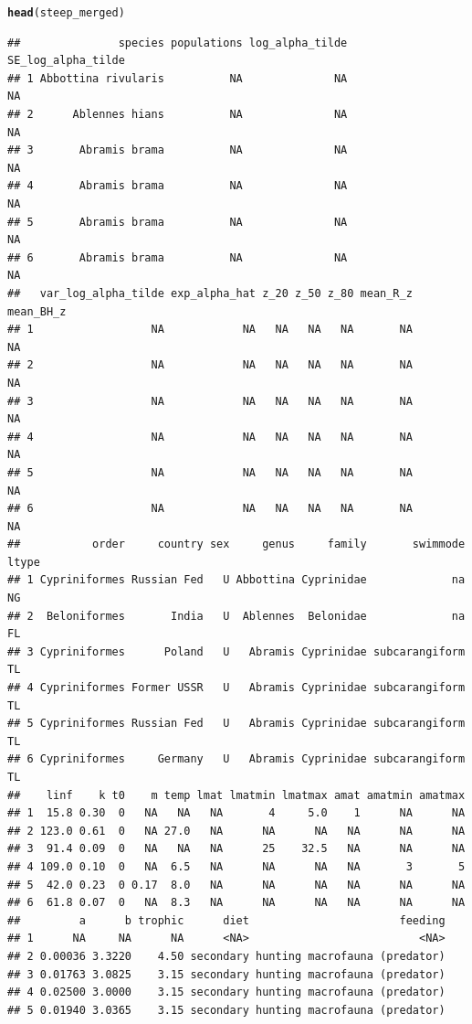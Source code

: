 \documentclass{dragonfly-report}\usepackage[]{graphicx}\usepackage[]{color}
\makeatletter
\newcommand{\hlstd}[1]{\textcolor[rgb]{0.345,0.345,0.345}{#1}}%
\newcommand{\hlkwd}[1]{\textcolor[rgb]{0.737,0.353,0.396}{\textbf{#1}}}%
\newenvironment{kframe}{%
 \def\at@end@of@kframe{}%
 \ifinner\ifhmode%
  \def\at@end@of@kframe{\end{minipage}}%
  \begin{minipage}{\columnwidth}%
 \fi\fi%
 \def\FrameCommand##1{\hskip\@totalleftmargin \hskip-\fboxsep
 \colorbox{shadecolor}{##1}\hskip-\fboxsep
     \hskip-\linewidth \hskip-\@totalleftmargin \hskip\columnwidth}%
 \MakeFramed {\advance\hsize-\width
   \@totalleftmargin\z@ \linewidth\hsize
   \@setminipage}}%
 {\par\unskip\endMakeFramed%
 \at@end@of@kframe}
\newenvironment{knitrout}{}{} %
\makeatother
\begin{document}
\begin{knitrout}
\begin{kframe}
\begin{alltt}
\hlkwd{head}\hlstd{(steep_merged)}
\end{alltt}
\begin{verbatim}
##               species populations log_alpha_tilde SE_log_alpha_tilde
## 1 Abbottina rivularis          NA              NA                 NA
## 2      Ablennes hians          NA              NA                 NA
## 3       Abramis brama          NA              NA                 NA
## 4       Abramis brama          NA              NA                 NA
## 5       Abramis brama          NA              NA                 NA
## 6       Abramis brama          NA              NA                 NA
##   var_log_alpha_tilde exp_alpha_hat z_20 z_50 z_80 mean_R_z mean_BH_z
## 1                  NA            NA   NA   NA   NA       NA        NA
## 2                  NA            NA   NA   NA   NA       NA        NA
## 3                  NA            NA   NA   NA   NA       NA        NA
## 4                  NA            NA   NA   NA   NA       NA        NA
## 5                  NA            NA   NA   NA   NA       NA        NA
## 6                  NA            NA   NA   NA   NA       NA        NA
##           order     country sex     genus     family       swimmode ltype
## 1 Cypriniformes Russian Fed   U Abbottina Cyprinidae             na    NG
## 2  Beloniformes       India   U  Ablennes  Belonidae             na    FL
## 3 Cypriniformes      Poland   U   Abramis Cyprinidae subcarangiform    TL
## 4 Cypriniformes Former USSR   U   Abramis Cyprinidae subcarangiform    TL
## 5 Cypriniformes Russian Fed   U   Abramis Cyprinidae subcarangiform    TL
## 6 Cypriniformes     Germany   U   Abramis Cyprinidae subcarangiform    TL
##    linf    k t0    m temp lmat lmatmin lmatmax amat amatmin amatmax
## 1  15.8 0.30  0   NA   NA   NA       4     5.0    1      NA      NA
## 2 123.0 0.61  0   NA 27.0   NA      NA      NA   NA      NA      NA
## 3  91.4 0.09  0   NA   NA   NA      25    32.5   NA      NA      NA
## 4 109.0 0.10  0   NA  6.5   NA      NA      NA   NA       3       5
## 5  42.0 0.23  0 0.17  8.0   NA      NA      NA   NA      NA      NA
## 6  61.8 0.07  0   NA  8.3   NA      NA      NA   NA      NA      NA
##         a      b trophic      diet                       feeding
## 1      NA     NA      NA      <NA>                          <NA>
## 2 0.00036 3.3220    4.50 secondary hunting macrofauna (predator)
## 3 0.01763 3.0825    3.15 secondary hunting macrofauna (predator)
## 4 0.02500 3.0000    3.15 secondary hunting macrofauna (predator)
## 5 0.01940 3.0365    3.15 secondary hunting macrofauna (predator)

\end{verbatim}
\end{kframe}
\end{knitrout}
\end{document}

